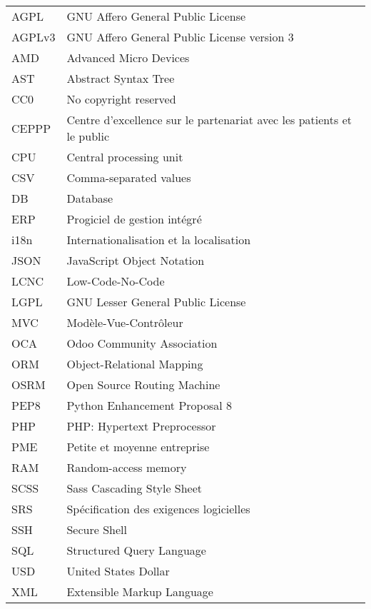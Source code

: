 \chapter*{\abbrevname}
\pagestyle{pagenumber}
%
\begin{acronym}
\end{acronym}
%
\begin{longtable}{lp{5in}}
AGPL      & GNU Affero General Public License\\
AGPLv3    & GNU Affero General Public License version 3\\
AMD       & Advanced Micro Devices\\
AST       & Abstract Syntax Tree\\
CC0       & No copyright reserved\\
CEPPP     & Centre d'excellence sur le partenariat avec les patients et le public\\
CPU       & Central processing unit\\
CSV       & Comma-separated values\\
DB        & Database\\
ERP       & Progiciel de gestion intégré\\
i18n      & Internationalisation et la localisation\\
JSON      & JavaScript Object Notation\\
LCNC      & Low-Code-No-Code\\
LGPL      & GNU Lesser General Public License\\
MVC       & Modèle-Vue-Contrôleur\\
OCA       & Odoo Community Association\\
ORM       & Object-Relational Mapping\\
OSRM      & Open Source Routing Machine\\
PEP8      & Python Enhancement Proposal 8\\
PHP       & PHP: Hypertext Preprocessor\\
PME       & Petite et moyenne entreprise\\
RAM       & Random-access memory\\
SCSS      & Sass Cascading Style Sheet\\
SRS       & Spécification des exigences logicielles\\
SSH       & Secure Shell\\
SQL       & Structured Query Language\\
USD       & United States Dollar\\
XML       & Extensible Markup Language\\

\end{longtable}
